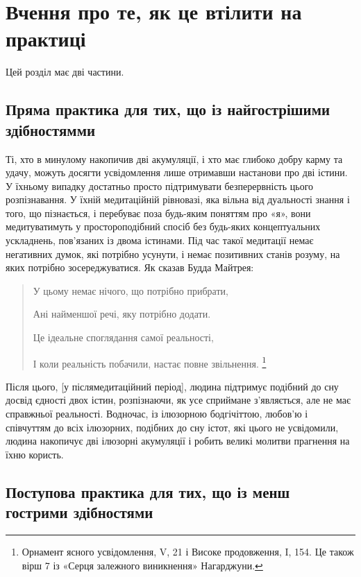 \documentclass{article}
\begin{document}
\section{Вчення про те, як це втілити на практиці}

Цей розділ має дві частини.

\subsection{Пряма практика для тих, що із найгострішими здібностямми}

Ті, хто в минулому накопичив дві акумуляції, і хто має глибоко добру карму та удачу, можуть досягти усвідомлення лише отримавши настанови про дві істини. У їхньому випадку достатньо просто підтримувати безперервність цього розпізнавання. У їхній медитаційній рівновазі, яка вільна від дуальності знання і того, що пізнається, і перебуває поза будь-яким поняттям про «я», вони медитуватимуть у простороподібний спосіб без будь-яких концептуальних ускладнень, пов’язаних із двома істинами. Під час такої медитації немає негативних думок, які потрібно усунути, і немає позитивних станів розуму, на яких потрібно зосереджуватися. Як сказав Будда Майтрея:

\begin{verse}
\item        У цьому немає нічого, що потрібно прибрати, \\
\item        Ані найменшої речі, яку потрібно додати. \\
\item        Це ідеальне споглядання самої реальності, \\
\item        І коли реальність побачили, настає повне звільнення. \footnote{Орнамент ясного усвідомлення, V, 21 і Високе продовження, I, 154. Це також вірш 7 із «Серця залежного виникнення» Нагарджуни.}
\end{verse}

Після цього, [у післямедитаційний період], людина підтримує подібний до сну
досвід єдності двох істин, розпізнаючи, як усе сприймане з’являється,
але не має справжньої реальності. Водночас, із ілюзорною бодгічіттою,
любов’ю і співчуттям до всіх ілюзорних, подібних до сну істот,
які цього не усвідомили, людина накопичує дві ілюзорні акумуляції
і робить великі молитви прагнення на їхню користь.

\subsection{Поступова практика для тих, що із менш гострими здібностями}
\end{document}
